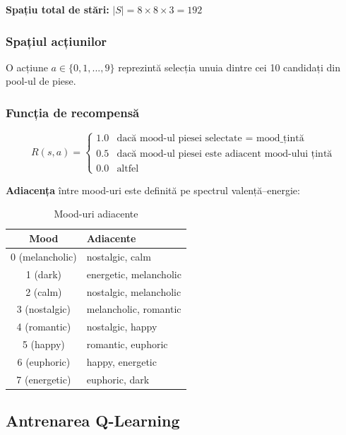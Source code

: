 \documentclass[12pt,a4paper]{article}
\begin{document}
\textbf{Spațiu total de stări:} $|S| = 8 \times 8 \times 3 = 192$

\subsubsection{Spațiul acțiunilor}

O acțiune $a \in \{0, 1, ..., 9\}$ reprezintă selecția unuia dintre cei 10 candidați din pool-ul de piese.

\subsubsection{Funcția de recompensă}

\begin{equation}
R(s, a) = \begin{cases}
1.0 & \text{dacă mood-ul piesei selectate = mood\_țintă} \\
0.5 & \text{dacă mood-ul piesei este adiacent mood-ului țintă} \\
0.0 & \text{altfel}
\end{cases}
\end{equation}

\textbf{Adiacența} între mood-uri este definită pe spectrul valență--energie:

\begin{table}[H]
\centering
\caption{Mood-uri adiacente}
\label{tab:adjacent}
\begin{tabular}{cl}
\toprule
\textbf{Mood} & \textbf{Adiacente} \\
\midrule
0 (melancholic) & nostalgic, calm \\
1 (dark)        & energetic, melancholic \\
2 (calm)        & nostalgic, melancholic \\
3 (nostalgic)   & melancholic, romantic \\
4 (romantic)    & nostalgic, happy \\
5 (happy)       & romantic, euphoric \\
6 (euphoric)    & happy, energetic \\
7 (energetic)   & euphoric, dark \\
\bottomrule
\end{tabular}
\end{table}

\FloatBarrier

\subsection{Antrenarea Q-Learning}
\label{sec:qlearning}
\end{document}
